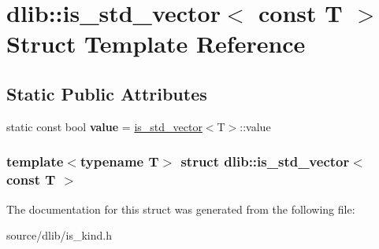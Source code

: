 \hypertarget{structdlib_1_1is__std__vector_3_01const_01T_01_4}{
\section{dlib::is\_\-std\_\-vector$<$ const T $>$ Struct Template Reference}
\label{structdlib_1_1is__std__vector_3_01const_01T_01_4}
}
\subsection*{Static Public Attributes}
\begin{DoxyCompactItemize}
\item 
\hypertarget{structdlib_1_1is__std__vector_3_01const_01T_01_4_a0d5baed76a7ae3203b0bc4a0440158de}{
static const bool {\bfseries value} = \hyperlink{structdlib_1_1is__std__vector}{is\_\-std\_\-vector}$<$T$>$::value}
\label{structdlib_1_1is__std__vector_3_01const_01T_01_4_a0d5baed76a7ae3203b0bc4a0440158de}

\end{DoxyCompactItemize}
\subsubsection*{template$<$typename T$>$ struct dlib::is\_\-std\_\-vector$<$ const T $>$}



The documentation for this struct was generated from the following file:\begin{DoxyCompactItemize}
\item 
source/dlib/is\_\-kind.h\end{DoxyCompactItemize}

